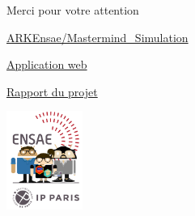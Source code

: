 \documentclass[10pt,xcolor=table,color={dvipsnames,usenames},ignorenonframetext,usepdftitle=false,french]{beamer}
\begin{document}
\begin{frame}{Merci pour votre attention}
\protect\hypertarget{merci-pour-votre-attention}{}

\href{https://github.com/ARKEnsae/Mastermind_Simulation}{\faGithub{} ARKEnsae/Mastermind\_Simulation}

\href{https://antuki.shinyapps.io/mastermind}{\faChartBar{} Application web}

\href{https://arkensae.github.io/Mastermind_Simulation/Rapport/Rapport.html}{\faEdit{} Rapport du projet}

\begin{center}
\includegraphics[width = 2.5cm]{img/LOGO-ENSAE.png}
\end{center}

\end{frame}
\end{document}
